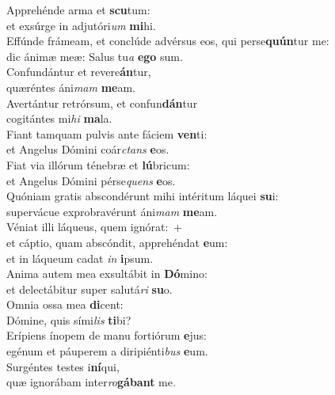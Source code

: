 \evenverse Apprehénde arma et \textbf{scu}tum:~\*\\
\evenverse et exsúrge in adjutóri\textit{um} \textbf{mi}hi.\\
\oddverse Effúnde frámeam, et conclúde advérsus eos, qui perse\textbf{quún}tur me:~\*\\
\oddverse dic ánimæ meæ: Salus tu\textit{a} \textbf{e}\textbf{go} sum.\\
\evenverse Confundántur et revere\textbf{án}tur,~\*\\
\evenverse quæréntes áni\textit{mam} \textbf{me}am.\\
\oddverse Avertántur retrórsum, et confun\textbf{dán}tur~\*\\
\oddverse cogitántes mi\textit{hi} \textbf{ma}la.\\
\evenverse Fiant tamquam pulvis ante fáciem \textbf{ven}ti:~\*\\
\evenverse et Angelus Dómini coár\textit{ctans} \textbf{e}os.\\
\oddverse Fiat via illórum ténebræ et \textbf{lú}bricum:~\*\\
\oddverse et Angelus Dómini pérse\textit{quens} \textbf{e}os.\\
\evenverse Quóniam gratis abscondérunt mihi intéritum láquei \textbf{su}i:~\*\\
\evenverse supervácue exprobravérunt áni\textit{mam} \textbf{me}am.\\
\oddverse Véniat illi láqueus, quem ignórat:~+\\
\oddverse  et cáptio, quam abscóndit, apprehéndat \textbf{e}um:~\*\\
\oddverse et in láqueum cadat \textit{in} \textbf{i}psum.\\
\evenverse Anima autem mea exsultábit in \textbf{Dó}mino:~\*\\
\evenverse et delectábitur super salutá\textit{ri} \textbf{su}o.\\
\oddverse Omnia ossa mea \textbf{di}cent:~\*\\
\oddverse Dómine, quis sími\textit{lis} \textbf{ti}bi?\\
\evenverse Erípiens ínopem de manu fortiórum \textbf{e}jus:~\*\\
\evenverse egénum et páuperem a diripiénti\textit{bus} \textbf{e}um.\\
\oddverse Surgéntes testes i\textbf{ní}qui,~\*\\
\oddverse quæ ignorábam inter\textit{ro}\textbf{gá}\textbf{bant} me.\\
